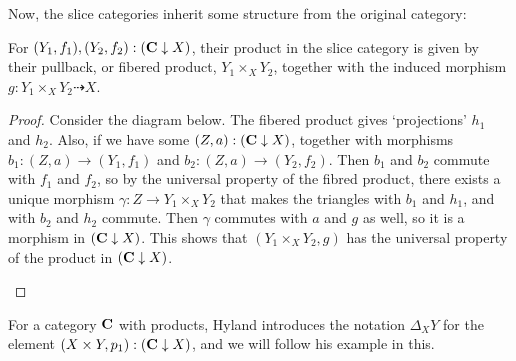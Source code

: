 Now, the slice categories inherit some structure from the original category:
\begin{lemma}
  For $ (Y_1, f_1), (Y_2, f_2) : (\mathbf{C} \downarrow X) $, their product in the slice category is given by their pullback, or fibered product, $ Y_1 \times_X Y_2 $, together with the induced morphism $ g: Y_1 \times_X Y_2 \dasharrow X $.
\end{lemma}
\begin{proof}
  Consider the diagram below. The fibered product gives `projections' $ h_1 $ and $ h_2 $. Also, if we have some $ (Z, a) : (\mathbf{C} \downarrow X) $, together with morphisms $ b_1 : (Z, a) \to (Y_1, f_1) $ and $ b_2 : (Z, a) \to (Y_2, f_2) $. Then $ b_1 $ and $ b_2 $ commute with $ f_1 $ and $ f_2 $, so by the universal property of the fibred product, there exists a unique morphism $ \gamma : Z \to Y_1 \times_X Y_2 $ that makes the triangles with $ b_1 $ and $ h_1 $, and with $ b_2 $ and $ h_2 $ commute. Then $ \gamma $ commutes with $ a $ and $ g $ as well, so it is a morphism in $ (\mathbf{C} \downarrow X) $. This shows that $ (Y_1 \times_X Y_2, g) $ has the universal property of the product in $ (\mathbf{C} \downarrow X) $.
  \begin{center}
  \end{center}
\end{proof}

For a category $ \mathbf{C} $ with products, Hyland introduces the notation $ \Delta_X Y $ for the element $ (X \times Y, p_1) : (\mathbf{C} \downarrow X) $, and we will follow his example in this.

